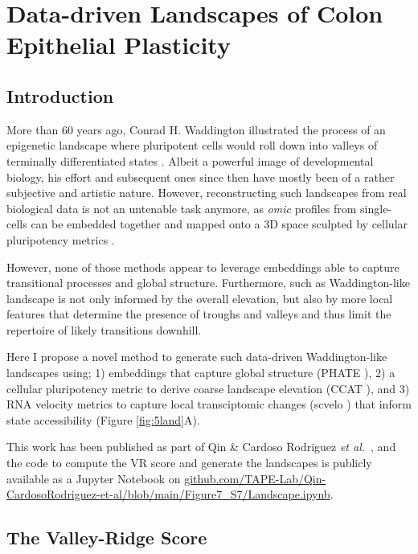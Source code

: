 \chapter{Data-driven Landscapes of Colon Epithelial Plasticity}
\label{05vr}

\newpage
\section{Introduction}

More than 60 years ago, Conrad H. Waddington illustrated the process of an epigenetic landscape where pluripotent cells would roll down into valleys of terminally differentiated states \cite{ch_waddington_waddington_1957}. Albeit a powerful image of developmental biology, his effort and subsequent ones since then have mostly been of a rather subjective and artistic nature. However, reconstructing such landscapes from real biological data is not an untenable task anymore, as \emph{omic} profiles from single-cells can be embedded together and mapped onto a 3D space sculpted by cellular pluripotency metrics \cite{chen_single-cell_2019}.

However, none of those methods appear to leverage embeddings able to capture transitional processes and global structure. Furthermore, such as Waddington-like landscape is not only informed by the overall elevation, but also by more local features that determine the presence of troughs and valleys and thus limit the repertoire of likely transitions downhill.

Here I propose a novel method to generate such data-driven Waddington-like landscapes using; 1) embeddings that capture global structure (PHATE \cite{moon_visualizing_2019}), 2) a cellular pluripotency metric to derive coarse landscape elevation (CCAT \cite{teschendorff_single-cell_2017}), and 3) RNA velocity metrics to capture local transciptomic changes (scvelo \cite{bergen_generalizing_2020}) that inform state accessibility (Figure \ref{fig:5land}A).

This work has been published as part of Qin \& Cardoso Rodriguez \emph{et al.}~\cite{cardoso_rodriguez_single-cell_2023}, and the code to compute the VR score and generate the landscapes is publicly available as a Jupyter Notebook on \url{github.com/TAPE-Lab/Qin-CardosoRodriguez-et-al/blob/main/Figure7_S7/Landscape.ipynb}. 

\section{The Valley-Ridge Score}

